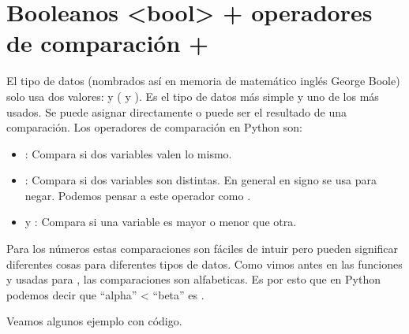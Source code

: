 \documentclass[a4paper,12pt,spanish]{sphinxmanual}
\begin{document}
\sphinxAtStartPar
{}

\sphinxstepscope


\chapter{Booleanos \textless{}bool\textgreater{} + operadores de comparación + }
\label{\detokenize{bool:booleanos-bool-operadores-de-comparacion-if}}\label{\detokenize{bool::doc}}
\sphinxAtStartPar
El tipo de datos  (nombrados así en memoria de matemático inglés
George Boole) solo usa dos valores:  y  ( y ).
Es el tipo de datos más simple y uno de los más usados.
Se puede asignar directamente o puede ser el resultado de una comparación.
Los operadores de comparación en Python son:
\begin{itemize}
\item {} 
\sphinxAtStartPar
\sphinxcode{\sphinxupquote{==}}: Compara si dos variables valen lo mismo.

\item {} 
\sphinxAtStartPar
\sphinxcode{\sphinxupquote{!=}}: Compara si dos variables son distintas. En general en signo \sphinxcode{\sphinxupquote{!}}
se usa para negar. Podemos pensar a este operador como .

\item {} 
\sphinxAtStartPar
\sphinxcode{\sphinxupquote{\textgreater{}}} y \sphinxcode{\sphinxupquote{\textless{}}}: Compara si una variable es mayor o menor que otra.

\end{itemize}

\sphinxAtStartPar
Para los números estas comparaciones son fáciles de intuir pero pueden significar
diferentes cosas para diferentes tipos de datos. Como vimos antes en las
funciones  y  usadas para , las comparaciones son alfabeticas.
Es por esto que en Python podemos decir que “alpha” \textless{} “beta” es .

\sphinxAtStartPar
Veamos algunos ejemplo con código.
\end{document}
